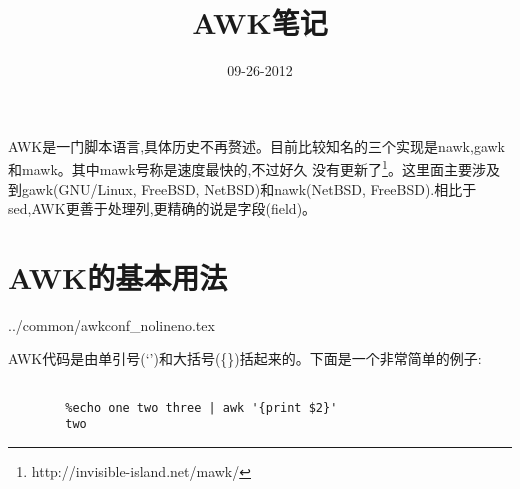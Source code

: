 
\title{AWK笔记}

\date{09-26-2012}


\maketitle

AWK是一门脚本语言,具体历史不再赘述。目前比较知名的三个实现是nawk,gawk和mawk。其中mawk号称是速度最快的,不过好久
没有更新了\footnote{http://invisible-island.net/mawk/}。这里面主要涉及到gawk(GNU/Linux, FreeBSD, NetBSD)和nawk(NetBSD,
FreeBSD).相比于sed,AWK更善于处理列,更精确的说是字段(field)。

\section{AWK的基本用法}

 {../common/awkconf_nolineno.tex}


AWK代码是由单引号(`')和大括号(\{\})括起来的。下面是一个非常简单的例子:\\

\begin{lstlisting}[title={简单例子},abovecaptionskip=0.5cm]

        %echo one two three | awk '{print $2}'
        two
\end{lstlisting}







